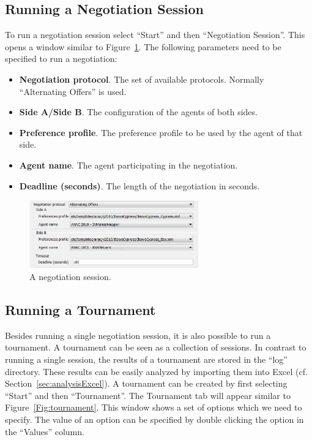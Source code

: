 \documentclass[]{article}
\begin{document}
\subsection{Running a Negotiation Session}
To run a negotiation session select ``Start'' and then ``Negotiation Session''. This opens a window similar to Figure~\ref{Fig:session}. The following parameters need to be specified to run a negotiation:
\begin{itemize}
	\item \textbf{Negotiation protocol}. The set of available protocols. Normally ``Alternating Offers'' is used.
	\item \textbf{Side A/Side B}. The configuration of the agents of both sides.
	\item \textbf{Preference profile}. The preference profile to be used by the agent of that side.
	\item \textbf{Agent name}. The agent participating in the negotiation.
	\item \textbf{Deadline (seconds)}. The length of the negotiation in seconds.
\end{itemize}

\begin{figure}[h!]
	\centering
	\includegraphics[width=0.65\textwidth]{media/image11.png}
\caption{A negotiation session.}\label{Fig:session}
\end{figure}


\subsection{Running a Tournament}\label{sec:runningTournament}
Besides running a single negotiation session, it is also possible to run a tournament. A tournament can be seen as a collection of sessions. In contrast to running a single session, the results of a tournament are stored in the ``log'' directory. These results can be easily analyzed by importing them into Excel (cf. Section~\ref{sec:analysisExcel}). A tournament can be created by first selecting ``Start'' and then ``Tournament''. The Tournament tab will appear similar to Figure~\ref{Fig:tournament}. This window shows a set of options which we need to specify. The value of an option can be specified by double clicking the option in the ``Values'' column.
\end{document}
